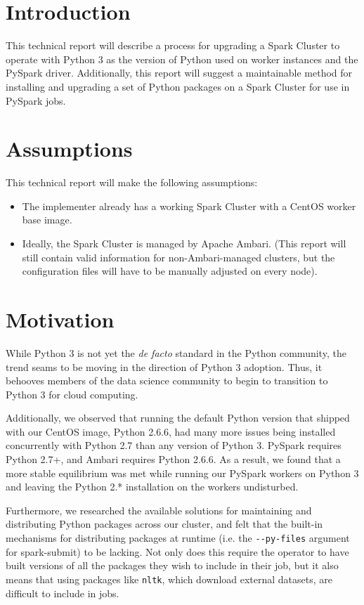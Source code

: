 \documentclass[9pt,twocolumn,twoside]{idsi}
\begin{document}
\makecoverpage

\maketitle

\section{Introduction}
This technical report will describe a process for upgrading a Spark Cluster to operate with Python 3 as the version of Python used on worker instances and the PySpark driver. Additionally, this report will suggest a maintainable method for installing and upgrading a set of Python packages on a Spark Cluster for use in PySpark jobs.

\section{Assumptions}
This technical report will make the following assumptions:
\begin{itemize}
  \item The implementer already has a working Spark Cluster with a CentOS worker base image.
  \item Ideally, the Spark Cluster is managed by Apache Ambari. (This report will still contain valid information for non-Ambari-managed clusters, but the configuration files will have to be manually adjusted on every node).
\end{itemize}

\section{Motivation}
While Python 3 is not yet the \emph{de facto} standard in the Python community, the trend seams to be moving in the direction of Python 3 adoption. Thus, it behooves members of the data science community to begin to transition to Python 3 for cloud computing.

Additionally, we observed that running the default Python version that shipped with our CentOS image, Python 2.6.6, had many more issues being installed concurrently with Python 2.7 than any version of Python 3. PySpark requires Python 2.7+, and Ambari requires Python 2.6.6. As a result, we found that a more stable equilibrium was met while running our PySpark workers on Python 3 and leaving the Python 2.* installation on the workers undisturbed.

Furthermore, we researched the available solutions for maintaining and distributing Python packages across our cluster, and felt that the built-in mechanisms for distributing packages at runtime (i.e. the \texttt{-\--py-files} argument for spark-submit) to be lacking. Not only does this require the operator to have built versions of all the packages they wish to include in their job, but it also means that using packages like \texttt{nltk}, which download external datasets, are difficult to include in jobs.
\end{document}
